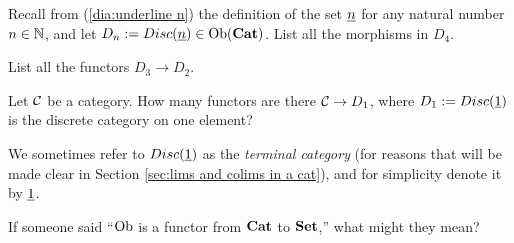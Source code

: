 \documentclass[CT4S-EN-RU]{subfiles}
\begin{document}
\begin{exampleRUS}\label{ex:discrete graph discrete cat}
\end{exampleRUS}

\begin{exerciseENG}
Recall from (\ref{dia:underline n}) the definition of the set $\underline{n}$ for any natural number $n\in{\mathbb N}$, and let $D_n:=Disc(\underline{n})\in\textnormal{Ob}({\bf Cat})$.
\sexc List all the morphisms in $D_4$. 
\item List all the functors $D_3\to D_2.$
\endsexc
\end{exerciseENG}

\begin{exerciseRUS}
\end{exerciseRUS}

\begin{exerciseENG}\label{exc:term cat}
Let $\mathcal{C}$ be a category. How many functors are there $\mathcal{C}\rightarrow D_1$, where $D_1:=Disc(\underline{1})$ is the discrete category on one element?
\end{exerciseENG}

\begin{exerciseRUS}\label{exc:term cat}
\end{exerciseRUS}

\begin{blockENG}
We sometimes refer to $Disc(\underline{1})$ as the {\em terminal category} (for reasons that will be made clear in Section \ref{sec:lims and colims in a cat}), and for simplicity denote it by $\underline{1}$.
\end{blockENG}

\begin{blockRUS}
\end{blockRUS}

\begin{exerciseENG}\label{exc:Ob is a functor}
If someone said “$\textnormal{Ob}$ is a functor from ${\bf Cat}$ to ${\bf Set}$,” what might they mean? 
\end{exerciseENG}

\begin{exerciseRUS}\label{exc:Ob is a functor}
\end{exerciseRUS}
\end{document}
